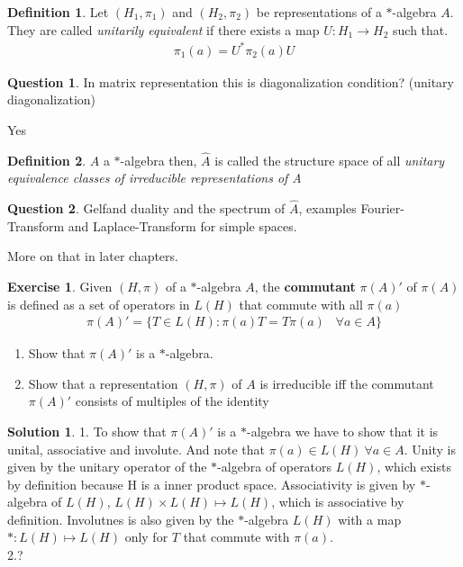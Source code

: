 \documentclass[a4paper]{article}
\theoremstyle{definition}
\newtheorem{definition}{Definition}
\theoremstyle{definition}
\newtheorem{question}{Question}
\theoremstyle{theorem}
\theoremstyle{theorem}
\newtheorem{exercise}{Exercise}
\theoremstyle{definition}
\newtheorem{solution}{Solution}
\begin{document}
\begin{definition}
    Let $(H_1, \pi _1)$ and $(H_2, \pi _2)$ be representations of a $*$-algebra $A$. They are called
    \textit{unitarily equivalent} if there exists a map $U: H_1 \rightarrow H_2$ such that.
    \begin{align*}
        \pi _1(a) = U^* \pi _2(a) U
    \end{align*}
\end{definition}

\begin{question}
    In matrix representation this is diagonalization condition? (unitary diagonalization)
\end{question}
Yes

\begin{definition}
    $A$ a $*$-algebra then, $\hat{A}$ is called the structure space of all \textit{unitary equivalence classes
    of irreducible representations of A}
\end{definition}

\begin{question}
    Gelfand duality and the spectrum of $\hat{A}$, examples Fourier-Transform and Laplace-Transform
    for simple spaces.
\end{question}
More on that in later chapters.

\begin{exercise}
    Given $(H, \pi)$ of a $*$-algebra $A$, the \textbf{commutant} $\pi (A)'$ of $\pi (A)$ is defined as a set
    of operators in $L(H)$ that commute with all $\pi (a)$
    \begin{align*}
        \pi (A)' = \{T \in L(H):\pi (a)T = T\pi (a) \;\;\; \forall a\in A\}
    \end{align*}
    \begin{enumerate}
        \item Show that $\pi (A)'$ is a $*$-algebra.
        \item Show that a representation $(H, \pi)$ of $A$ is irreducible iff the commutant $\pi (A)'$
                consists of multiples of the identity
    \end{enumerate}
\end{exercise}
\begin{solution}
    1. To show that $\pi (A)'$ is a $*$-algebra we have to show that it is unital, associative and involute.
    And note that $\pi (a) \in L(H)\ \forall a \in A$.
    Unity is given by the unitary operator of the $*$-algebra of operators $L(H)$, which exists by definition
    because H is a inner product space. Associativity is given by $*$-algebra of $L(H)$, $L(H) \times L(H) \mapsto L(H)$,
    which is associative by definition. Involutnes is also given by the $*$-algebra $L(H)$
    with a map $*: L(H) \mapsto L(H)$ only for $T$ that commute with $\pi (a)$.
    \\
    2.?
\end{solution}
\end{document}

